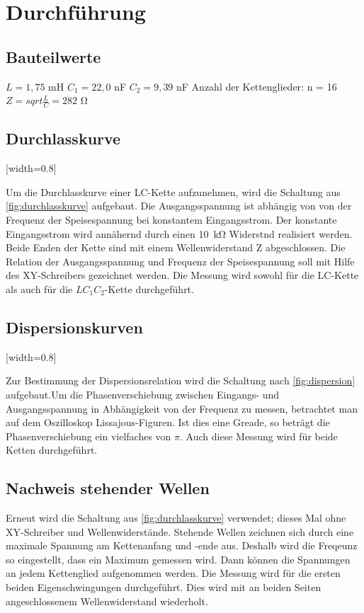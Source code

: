 \section{Durchführung}
\label{sec:Durchführung}

\subsection{Bauteilwerte}
$L = 1,75$ \si{\milli\henry}
$C_{1} = 22,0$ \si{\nano\farad}
$C_{2} = 9,39$ \si{\nano\farad}
Anzahl der Kettenglieder: n = 16
$Z = sqrt{\frac{L}{C}} = 282$ \si{\ohm}

\subsection{Durchlasskurve}

[width=0.8\textwidth]

Um die Durchlasskurve einer LC-Kette aufzunehmen, wird die Schaltung aus \ref{fig:durchlasskurve}
aufgebaut. Die Ausgangsspannung ist abhängig von von der Frequenz der Speisespannung bei konstantem Eingangsstrom. Der konstante Eingangsstrom wird annähernd durch einen \SI{10}{\kilo\ohm} Widerstnd realisiert werden. Beide Enden der Kette sind mit einem Wellenwiderstand Z abgeschlossen. Die Relation der Ausgangsspannung und Frequenz der Speisespannung soll mit Hilfe des XY-Schreibers gezeichnet werden.
Die Messung wird sowohl für die LC-Kette als auch für die $LC_{1}C_{2}$-Kette durchgeführt.

\subsection{Dispersionskurven}

[width=0.8\textwidth]

Zur Bestimmung der Dispersionsrelation wird die Schaltung nach \ref{fig:dispersion} aufgebaut.Um die Phasenverschiebung zwischen Eingangs- und Ausgangsspannung in Abhängigkeit von der Frequenz zu messen, betrachtet man auf dem Oszilloskop Lissajous-Figuren. Ist dies eine Greade, so beträgt die Phasenverschiebung ein vielfaches von $\pi$. Auch diese Messung wird für beide Ketten durchgeführt.

\subsection{Nachweis stehender Wellen}
Erneut wird die Schaltung aus \ref{fig:durchlasskurve} verwendet; dieses Mal ohne XY-Schreiber und Wellenwiderstände. Stehende Wellen zeichnen sich durch eine maximale Spannung am Kettenanfang und -ende aus. Deshalb wird die Freqeunz so eingestellt, dass ein Maximum gemessen wird. Dann können die Spannungen an jedem Kettenglied aufgenommen werden. Die Messung wird für die ersten beiden Eigenschwingungen durchgeführt.
Dies wird mit an beiden Seiten angeschlossenem Wellenwiderstand wiederholt.
